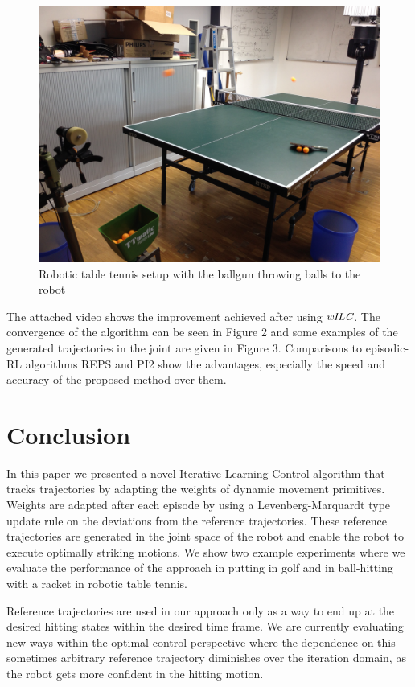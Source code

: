\documentclass[10pt,a4paper]{article}
\newcommand{\alg}{\emph{wILC}}
\begin{document}
\begin{figure}
\center
\includegraphics[scale=0.05, angle= 180]{ballgun.jpg}			
\caption{Robotic table tennis setup with the ballgun throwing balls to the robot}
\label{barrettArm}
\end{figure}

The attached video shows the improvement achieved after using $\alg$. The convergence of the algorithm can be seen in Figure 2 and some examples of the generated trajectories in the joint are given in Figure 3. Comparisons to episodic-RL algorithms REPS and PI2 show the advantages, especially the speed and accuracy of the proposed method over them.

\section{Conclusion}\label{conclusion}

In this paper we presented a novel Iterative Learning Control algorithm that tracks trajectories by adapting the weights of dynamic movement primitives. Weights are adapted after each episode by using a Levenberg-Marquardt type update rule on the deviations from the reference trajectories. These reference trajectories are generated in the joint space of the robot and enable the robot to execute optimally striking motions. We show two example experiments where we evaluate the performance of the approach in putting in golf and in ball-hitting with a racket in robotic table tennis. 

Reference trajectories are used in our approach only as a way to end up at the desired hitting states within the desired time frame. We are currently evaluating new ways within the optimal control perspective where the dependence on this sometimes arbitrary reference trajectory diminishes over the iteration domain, as the robot gets more confident in the hitting motion.
\end{document}
